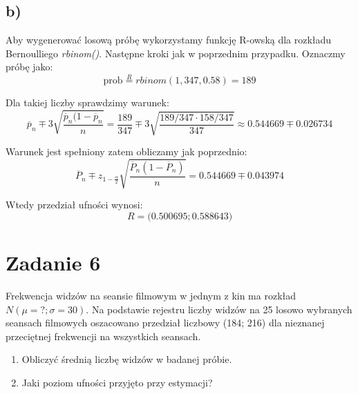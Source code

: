 \documentclass{article}
\begin{document}
\subsection{b)}
Aby wygenerować losową próbę wykorzystamy funkcję R-owską dla rozkładu Bernoulliego \textit{rbinom()}. Następne kroki jak w poprzednim przypadku. Oznaczmy próbę jako:
\[ \text{prob} \overset{R}{=} rbinom(1, 347, 0.58) = 189 \]

Dla takiej liczby sprawdzimy warunek:
\[ \overline{p}_n \mp 3\sqrt{\frac{\overline{p}_n(1-\overline{p}_n}{n}} = \frac{189}{347} \mp 3\sqrt{\frac{189/347\cdot 158/347}{347}} \approx 0.544669 \mp 0.026734 \]

Warunek jest spełniony zatem obliczamy jak poprzednio:
\[ \overline{P}_n \mp z_{1-\frac{\alpha}{2}} \sqrt{\frac{\overline{P}_n(1-\overline{P}_n) }{n}} = 0.544669 \mp 0.043974\]

Wtedy przedział ufności wynosi:
\[R = \Big( 0.500695; 0.588643\Big) \]

\newpage
\section{Zadanie 6}
Frekwencja widzów na seansie filmowym w jednym z kin ma rozkład $N(\mu=?;\sigma=30)$. Na podstawie rejestru liczby widzów na 25 losowo wybranych seansach filmowych oszacowano przedział liczbowy (184; 216) dla nieznanej przeciętnej frekwencji na wszystkich seansach.
\begin{enumerate}[label = \alph*)]
\item Obliczyć średnią liczbę widzów w badanej próbie.
\item Jaki poziom ufności przyjęto przy estymacji?
\end{enumerate}
\end{document}
